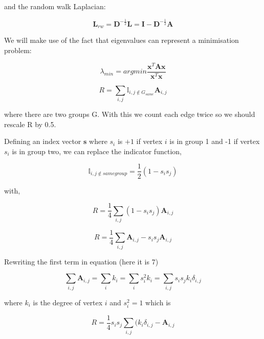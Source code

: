 and the random walk Laplacian:

\begin{equation}
\mathbf{L}_{rw}=\mathbf{D}^{-\frac{1}{2}}\mathbf{L}=\mathbf{I}-\mathbf{D}^{-\frac{1}{2}}\mathbf{A}
\end{equation}

We will make use of the fact that eigenvalues can represent a minimisation problem:

\begin{equation}
\lambda_{min}=\mathit{argmin}\frac{\mathbf{x}^T\mathbf{A}\mathbf{x}}{\mathbf{x}^T\mathbf{x}}
\end{equation}


\begin{equation}
R = \sum_{i,j}\mathbb{I}_{i,j\notin G_{same} }\mathbf{A}_{i,j}
\end{equation}

where there are two groups G. With this we count each edge twice so we should rescale R by 0.5.

Defining an index vector $\mathbf{s}$ where $s_i$ is $+1$ if vertex $i$ is in group 1 and -1 if vertex $s_i$ is in group two, we can replace the indicator function,

\begin{equation}
\mathbb{I}_{i,j\notin samegroup}=\frac{1}{2}(1-s_i s_j)
\end{equation}

with,

\begin{equation}
R=\frac{1}{4}\sum_{i,j}(1-s_i s_j)\mathbf{A}_{i,j}
\end{equation}

\begin{equation}
R = \frac{1}{4}\sum_{i,j}\mathbf{A}_{i,j}-s_i s_j \mathbf{A}_{i,j}
\end{equation}

Rewriting the first term in equation (here it is 7)

\begin{equation}
\sum_{i,j}\mathbf{A}_{i,j}=\sum_i k_i = \sum_i s_i ^2 k_i = \sum_{i,j} s_i s_j k_i \delta_{i,j}
\end{equation}

where $k_i$ is the degree of vertex $i$ and $s_i^2 = 1$ which is

\begin{equation}
R = \frac{1}{4}s_i s_j \sum_{i,j}(k_i \delta_{i,j} - \mathbf{A}_{i,j}
\end{equation}


